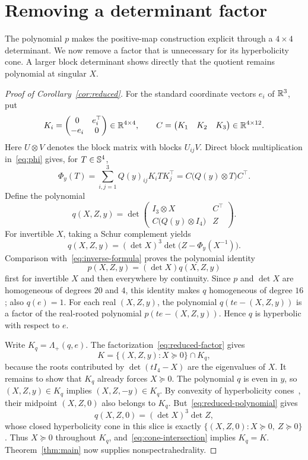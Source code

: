 \section{Removing a determinant factor}\label{sec:reduced}

The polynomial $p$ makes the positive-map construction explicit through
a $4\times4$ determinant. We now remove a factor that is unnecessary for
its hyperbolicity cone. A larger block determinant shows directly that
the quotient remains polynomial at singular $X$.

\begin{proof}[Proof of Corollary~\ref{cor:reduced}]
For the standard coordinate vectors $e_i$ of $\mathbb R^3$, put
\[
 K_i=\begin{pmatrix}0&e_i^\top\\-e_i&0\end{pmatrix}\in\mathbb R^{4\times4},
 \qquad C=\begin{pmatrix}K_1&K_2&K_3\end{pmatrix}\in\mathbb R^{4\times12}.
\]
Here $U\otimes V$ denotes the block matrix with blocks $U_{ij}V$.
Direct block multiplication in~\eqref{eq:phi} gives, for $T\in\mathbb S^4$,
\[
 \Phi_y(T)=\sum_{i,j=1}^3 Q(y)_{ij}K_iTK_j^\top
          =C\bigl(Q(y)\otimes T\bigr)C^\top.
\]
Define the polynomial
\begin{equation}\label{eq:reduced-polynomial}
 q(X,Z,y)=\det\begin{pmatrix}
 I_3\otimes X&C^\top\\
 C\bigl(Q(y)\otimes I_4\bigr)&Z
 \end{pmatrix}.
\end{equation}
For invertible $X$, taking a Schur complement yields
\[
 q(X,Z,y)=(\det X)^3\det\bigl(Z-\Phi_y(X^{-1})\bigr).
\]
Comparison with~\eqref{eq:inverse-formula} proves the polynomial identity
\begin{equation}\label{eq:reduced-factor}
 p(X,Z,y)=(\det X)q(X,Z,y)
\end{equation}
first for invertible $X$ and then everywhere by continuity.
Since $p$ and $\det X$ are homogeneous of degrees $20$ and $4$, this
identity makes $q$ homogeneous of degree $16$; also $q(e)=1$.
For each real $(X,Z,y)$, the polynomial $q(te-(X,Z,y))$ is a factor of
the real-rooted polynomial $p(te-(X,Z,y))$. Hence $q$ is hyperbolic
with respect to $e$.

Write $K_q=\Lambda_+(q,e)$. The factorization~\eqref{eq:reduced-factor}
gives
\begin{equation}\label{eq:cone-intersection}
 K=\{(X,Z,y):X\succeq0\}\cap K_q,
\end{equation}
because the roots contributed by $\det(tI_4-X)$ are the eigenvalues of
$X$. It remains to show that $K_q$ already forces $X\succeq0$.
The polynomial $q$ is even in $y$, so $(X,Z,y)\in K_q$ implies
$(X,Z,-y)\in K_q$. By convexity of hyperbolicity
cones~\cite{garding-1959}, their midpoint $(X,Z,0)$ also belongs to $K_q$.
But~\eqref{eq:reduced-polynomial} gives
\[
 q(X,Z,0)=(\det X)^3\det Z,
\]
whose closed hyperbolicity cone in this slice is exactly
$\{(X,Z,0):X\succeq0,\ Z\succeq0\}$.
Thus $X\succeq0$ throughout $K_q$, and~\eqref{eq:cone-intersection}
implies $K_q=K$. Theorem~\ref{thm:main} now supplies nonspectrahedrality.
\end{proof}
